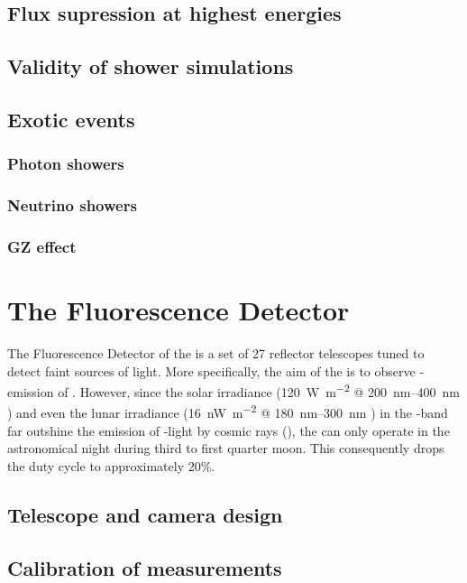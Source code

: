 \subsection{Flux supression at highest energies}
\label{ssec}

\subsection{Validity of shower simulations}


\subsection{Exotic events}
\subsubsection{Photon showers}
\subsubsection{Neutrino showers}
\subsubsection{GZ effect}

\section{The Fluorescence Detector}
\label{sec:fd}

The Fluorescence Detector of the \PAO is a set of 27 reflector telescopes tuned
to detect faint sources of \UV light. More specifically, the aim of the \FD is
to observe \UV-emission of \EAS. However, since the solar irradiance 
(\SI{120}{\watt\per\meter\squared} @
\SIrange[range-phrase={--}]{200}{400}{\nano\meter} \cite{Snow2013}) and even the
lunar irradiance (\SI{16}{\nano\watt\per\meter\squared} @
\SIrange[range-phrase={--}]{180}{300}{\nano\meter} \cite{Lean1989}) in the 
\UV-band far outshine the emission of \UV-light by cosmic rays (), the \FD can 
only operate in the astronomical night during third to first quarter moon. This 
consequently drops the duty cycle to approximately 20\%.

\subsection{Telescope and camera design}
\label{ssec:fd-design}

\subsection{Calibration of measurements}
\label{ssec:fd-calibration}

